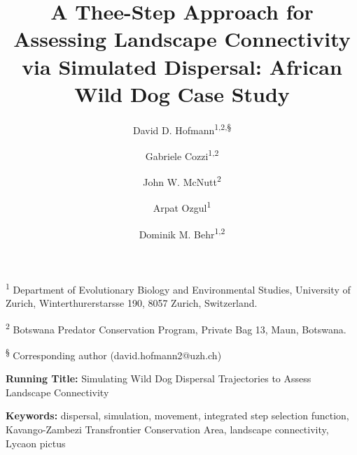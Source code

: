 \documentclass[abstract=on,10pt,a4paper,bibliography=totocnumbered]{article}
\title{A Thee-Step Approach for Assessing Landscape Connectivity via Simulated
Dispersal: African Wild Dog Case Study}
\author{
  David D. Hofmann\textsuperscript{1,2,\S} \and
  Gabriele Cozzi\textsuperscript{1,2} \and
  John W. McNutt\textsuperscript{2} \and
  Arpat Ozgul\textsuperscript{1} \and
  Dominik M. Behr\textsuperscript{1,2}
}
\begin{document}



\maketitle

\begin{flushleft}

\vspace{0.5cm}

\textsuperscript{1} Department of Evolutionary Biology and Environmental
Studies, University of Zurich, Winterthurerstarsse 190, 8057 Zurich,
Switzerland.

\textsuperscript{2} Botswana Predator Conservation Program, Private Bag 13,
Maun, Botswana.

\textsuperscript{\S} Corresponding author (david.hofmann2@uzh.ch)

\vspace{4cm}

\textbf{Running Title:} Simulating Wild Dog Dispersal Trajectories to Assess
Landscape Connectivity

\vspace{0.5cm}

\textbf{Keywords:} dispersal, simulation, movement, integrated step selection
function, Kavango-Zambezi Transfrontier Conservation Area, landscape
connectivity, Lycaon pictus

\end{flushleft}
\end{document}
